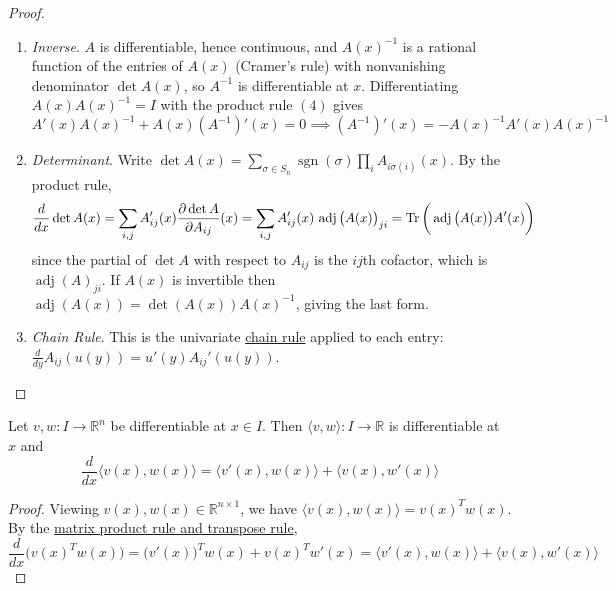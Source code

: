 \begin{proof}
\begin{enumerate}
			\item \textit{Inverse}. $A$ is differentiable, hence continuous, and $A(x)^{-1}$ is a rational function of the entries of $A(x)$ (Cramer's rule) with nonvanishing denominator $\det A(x)$, so $A^{-1}$ is differentiable at $x$. Differentiating $A(x) A(x)^{-1} = I$ with the product rule $(4)$ gives
				\begin{equation}
					A'(x) A(x)^{-1} + A(x) (A^{-1})'(x) = 0 \implies (A^{-1})'(x) = -A(x)^{-1} A'(x) A(x)^{-1}
				\end{equation}

			\item \textit{Determinant}. Write $\det A(x) = \sum_{\sigma \in S_n} \operatorname{sgn}(\sigma) \prod_{i} A_{i \sigma(i)}(x)$. By the product rule,
				\begin{equation}
					\frac{d}{dx} \det A(x) = \sum_{i, j} A_{ij}'(x) \frac{\partial \det A}{\partial A_{ij}}(x) = \sum_{i, j} A_{ij}'(x) \, \operatorname{adj}\big(A(x)\big)_{ji} = \operatorname{Tr} \bigg( \operatorname{adj}\big(A(x)\big) A'(x) \bigg)
				\end{equation}
				since the partial of $\det A$ with respect to $A_{ij}$ is the $ij$th cofactor, which is $\operatorname{adj}(A)_{ji}$. If $A(x)$ is invertible then $\operatorname{adj}(A(x)) = \det(A(x)) A(x)^{-1}$, giving the last form.

			\item \textit{Chain Rule}. This is the univariate \hyperref[real-thm:chain]{chain rule} applied to each entry: $\frac{d}{dy} A_{ij}(u(y)) = u'(y) A_{ij}'(u(y))$.
		\end{enumerate}
	\end{proof}

	\begin{corollary}
	  \label{cor:inner-product-rule}
		Let $v, w: I \to \mathbb{R}^n$ be differentiable at $x \in I$. Then $\langle v, w \rangle: I \to \mathbb{R}$ is differentiable at $x$ and
		\begin{equation}
			\frac{d}{dx} \langle v(x), w(x) \rangle = \langle v'(x), w(x) \rangle + \langle v(x), w'(x) \rangle
		\end{equation}
	\end{corollary}
	\begin{proof}
	  Viewing $v(x), w(x) \in \mathbb{R}^{n \times 1}$, we have $\langle v(x), w(x) \rangle = v(x)^T w(x)$. By the \hyperref[thm:scalar-input-matrix-valued-rules]{matrix product rule and transpose rule},
		\begin{equation}
			\frac{d}{dx} \big( v(x)^T w(x) \big) = \big( v'(x) \big)^T w(x) + v(x)^T w'(x) = \langle v'(x), w(x) \rangle + \langle v(x), w'(x) \rangle
		\end{equation}
	\end{proof}

